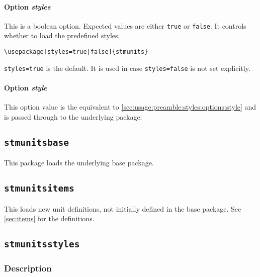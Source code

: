 \documentclass[%
  type=article,%
  layout=koma,%
  cleveref=true,%
  conditionallox=true,%
  conditionalloxnewpage=false,%
  date=true,%
  hyperref=true,%
  index=true,%
  listings=true,%
  math=true,%
]{stmtext}
\begin{document}
\paragraph{Option \protect\textit{styles}} 
\label{sec:usage:preamble:wholepackage:options:styles}

This is a boolean option. Expected values are either \texttt{true} or \texttt{false}. It controls whether to load the predefined styles.

\begin{verbatim}
\usepackage[styles=true|false]{stmunits}
\end{verbatim}

\texttt{styles=true} is the default. It is used in case \texttt{styles=false} is not set explicitly.

\paragraph{Option \protect\textit{style}} 
\label{sec:usage:preamble:wholepackage:options:style}

This option value is the equivalent to \cref{sec:usage:preamble:styles:options:style} and is passed through to the underlying package.

\subsection{\protect\texttt{stmunitsbase}}
\label{sec:usage:preamble:base}

This package loads the underlying base package.%

\subsection{\protect\texttt{stmunitsitems}}
\label{sec:usage:preamble:items}

This loads new unit definitions, not initially defined in the base package. See \cref{sec:items} for the definitions.

\subsection{\protect\texttt{stmunitsstyles}}
\label{sec:usage:preamble:styles}

\subsubsection{Description}
\label{sec:usage:preamble:styles:description}
\end{document}
